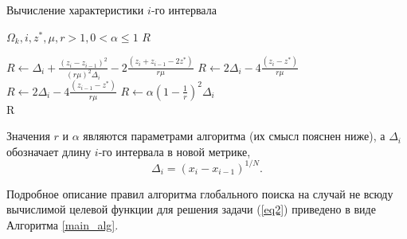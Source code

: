 \documentclass[a4paper,12pt,russian]{article}
\begin{document}
\begin{algorithm}
\caption{Вычисление характеристики $i$-го интервала}\label{charact_alg}
\begin{algorithmic}[1]
\Require $\Omega_k, i, z^*, \mu, r >1, 0 < \alpha \leq 1$
\Ensure $R$

  
           \State $R \gets \Delta _i+\frac {{(z_i-z_{i-1})}^2}{{(r \mu)}^2 \Delta _i} - 2 \frac {(z_i+z_{i-1}-2z^*)}{r \mu}$
  
           \State $R \gets 2 \Delta _i-4 \frac {(z_i-z^*)}{r \mu}$
 
            \State $ R \gets 2 \Delta _i-4 \frac {(z_{i-1}-z^*)}{r \mu}$
\Else {}
           \State $R \gets \alpha{(1-\frac{1}{r})}^2 \Delta _i$
\EndIf\\
\Return R
\end{algorithmic}
\end{algorithm}

Значения $r$ и $\alpha$ являются параметрами алгоритма (их смысл пояснен ниже), а $\Delta_i$ обозначает длину $i$-го интервала в новой метрике,
\[
\Delta _i= (x_i-x_{i-1})^{1/N}.
\]

Подробное описание правил алгоритма глобального поиска на случай не всюду вычислимой целевой функции для решения задачи (\ref{eq2}) приведено в виде Алгоритма \ref{main_alg}.
\end{document}
